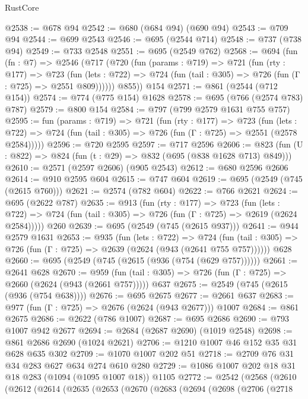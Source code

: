 \begin{lexlean}{RustCore}
\begin{coremodule}
@2538 := @678 @94
@2542 := @680 (@684 @94) (@690 @94)
@2543 := @709 @94
@2544 := @699 @2543
@2546 := @695 (@2544 @714)
@2548 := @737 (@738 @94)
@2549 := @733 @2548
@2551 := @695 (@2549 @762)
@2568 := @694
    (fun (fn : @7) =>
    @2546
      (@717
        (@720
          (fun (params : @719) =>
          @721
            (fun (rty : @177) =>
            @723
              (fun (lets : @722) =>
              @724 (fun (tail : @305) => @726 (fun (Γ : @725) => @2551 @809))))))
        @855))
    @154
@2571 := @861 (@2544 (@712 @154))
@2574 := @774 (@775 @154) @1628
@2578 := @695 (@766 (@2574 @783) @787)
@2579 := @800 @154
@2584 := @797 (@799 @2579 @1631 @755 @757)
@2595 := fun (params : @719) =>
  @721
    (fun (rty : @177) =>
    @723
      (fun (lets : @722) =>
      @724 (fun (tail : @305) => @726 (fun (Γ : @725) => @2551 (@2578 @2584)))))
@2596 := @720 @2595
@2597 := @717 @2596
@2606 := @823 (fun (U : @822) => @824 (fun (t : @29) => @832 (@695 (@838 @1628 @713) @849)))
@2610 := @2571 (@2597 @2606) (@905 @2543)
@2612 := @680 @2596 @2606
@2614 := @910 @2595 @604
@2615 := @747 @604
@2619 := @695 (@2549 (@745 (@2615 @760)))
@2621 := @2574 (@782 @604)
@2622 := @766 @2621
@2624 := @695 (@2622 @787)
@2635 := @913
    (fun (rty : @177) =>
    @723
      (fun (lets : @722) =>
      @724 (fun (tail : @305) => @726 (fun (Γ : @725) => @2619 (@2624 @2584)))))
    @260
@2639 := @695 (@2549 (@745 (@2615 @937)))
@2641 := @944 @2579 @1631
@2653 := @935
    (fun (lets : @722) =>
    @724 (fun (tail : @305) => @726 (fun (Γ : @725) => @2639 (@2624 (@943 (@2641 @755 @757))))))
    @628
@2660 := @695 (@2549 (@745 (@2615 (@936 (@754 (@629 @757))))))
@2661 := @2641 @628
@2670 := @959 (fun (tail : @305) => @726 (fun (Γ : @725) => @2660 (@2624 (@943 (@2661 @757))))) @637
@2675 := @2549 (@745 (@2615 (@936 (@754 @638))))
@2676 := @695 @2675
@2677 := @2661 @637
@2683 := @977 (fun (Γ : @725) => @2676 (@2624 (@943 @2677))) @1007
@2684 := @861 @2675
@2686 := @2622 (@786 @1007)
@2687 := @695 @2686
@2690 := @793 @1007 @942 @2677
@2694 := @2684 (@2687 @2690) (@1019 @2548)
@2698 := @861 @2686 @2690 (@1024 @2621)
@2706 := @1210 @1007 @46 @152 @35 @31 @628 @635 @302
@2709 := @1070 @1007 @202 @51
@2718 := @2709 @76 @31 @34 @283 @627 @634 @274 @610 @280
@2729 := @1086 @1007 @202 @18 @31 @18 @283 (@1094 (@1095 @1007 @18)) @1105
@2772 := @2542
    (@2568
      (@2610
        (@2612
          (@2614
            (@2635
              (@2653
                (@2670
                  (@2683
                    (@2694
                      (@2698
                        (@2706
                          (@2718

\end{coremodule}
\end{lexlean}
